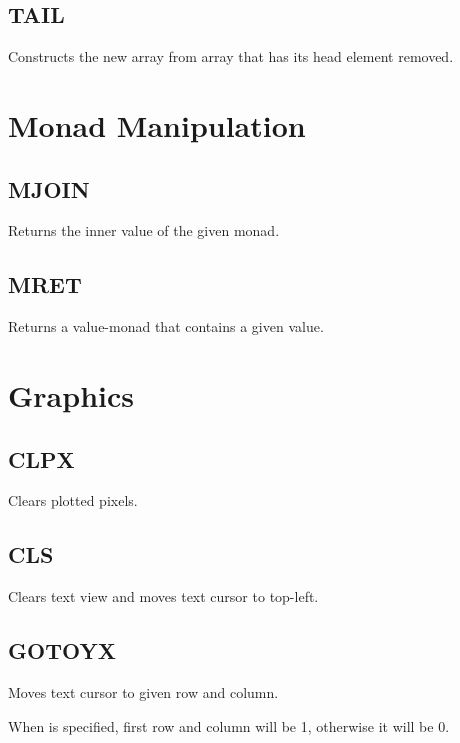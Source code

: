     \subsection{TAIL}
        \par
        Constructs the new array from array  that has its head element removed.

\section{Monad Manipulation}

    \subsection{MJOIN}
        \par
        Returns the inner value of the given monad.
    \subsection{MRET}
        \par
        Returns a value-monad that contains a given value.
        
\section{Graphics}

    \subsection{CLPX}
        \par
        Clears plotted pixels.
    \subsection{CLS}
        \par
        Clears text view and moves text cursor to top-left.
    \subsection{GOTOYX}
        \par
        Moves text cursor to given row and column.\par
        When  is specified, first row and column will be 1, otherwise it will be 0.
